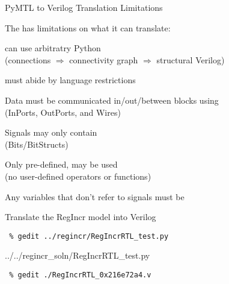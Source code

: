 \begin{frame}{PyMTL to Verilog Translation Limitations}

{}The  has limitations on what it can translate:

\medskip
\begin{cbxlist}[ll]

  \1  can use arbitratry Python \\ (connections
        $\Rightarrow$ connectivity graph $\Rightarrow$ structural
        Verilog)

  \1  must abide by language restrictions

  \pause

    \2 Data must be communicated in/out/between blocks using  \\
       (InPorts, OutPorts, and Wires)

    \2 Signals may only contain  \\
       (Bits/BitStructs)

    \2 Only pre-defined,  may be
       used \\ (no user-defined operators or functions)

    \2 Any variables that don't refer to signals must be 

\end{cbxlist}
\end{frame}

\begin{task}\begin{frame}[fragile]{Translate the RegIncr model into Verilog}

\vspace{-0.15in}
\begin{Verbatim}[commandchars=\\\{\}]
 % cd    \midtilde/pymtl-tut/build
 % gedit ../regincr/RegIncrRTL_test.py
\end{Verbatim}
\vspace{-0.17in}

%
{../../regincr_soln/RegIncrRTL_test.py}

\vspace{-0.2in}
\begin{Verbatim}[commandchars=\\\{\}]
 % py.test ../regincr/RegIncrRTL_test.py -v --test-verilog
 % gedit ./RegIncrRTL_0x216e72a4.v
\end{Verbatim}

\end{frame}
\end{task}

